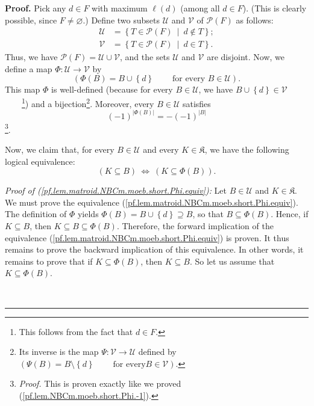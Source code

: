 \documentclass[numbers=enddot,12pt,final,onecolumn,notitlepage]{scrartcl}%
\theoremstyle{definition}
\newenvironment{proof}[1][Proof]{\noindent\textbf{#1.} }{\ \rule{0.5em}{0.5em}}
\begin{document}
\begin{proof}
Pick any $d\in F$ with maximum $\ell\left(  d\right)  $ (among all $d\in F$).
(This is clearly possible, since $F\neq\varnothing$.) Define two subsets
$\mathcal{U}$ and $\mathcal{V}$ of $\mathcal{P}\left(  F\right)  $ as follows:%
\begin{align*}
\mathcal{U}  &  =\left\{  T\in\mathcal{P}\left(  F\right)  \ \mid\ d\notin
T\right\}  ;\\
\mathcal{V}  &  =\left\{  T\in\mathcal{P}\left(  F\right)  \ \mid\ d\in
T\right\}  .
\end{align*}
Thus, we have $\mathcal{P}\left(  F\right)  =\mathcal{U}\cup\mathcal{V}$, and
the sets $\mathcal{U}$ and $\mathcal{V}$ are disjoint. Now, we define a map
$\Phi:\mathcal{U}\rightarrow\mathcal{V}$ by%
\[
\left(  \Phi\left(  B\right)  =B\cup\left\{  d\right\}
\ \ \ \ \ \ \ \ \ \ \text{for every }B\in\mathcal{U}\right)  .
\]
This map $\Phi$ is well-defined (because for every $B\in\mathcal{U}$, we have
$B\cup\left\{  d\right\}  \in\mathcal{V}$\ \ \ \ \footnote{This follows from
the fact that $d\in F$.}) and a bijection\footnote{Its inverse is the map
$\Psi:\mathcal{V}\rightarrow\mathcal{U}$ defined by $\left(  \Psi\left(
B\right)  =B\setminus\left\{  d\right\}  \ \ \ \ \ \ \ \ \ \ \text{for every
}B\in\mathcal{V}\right)  $.}. Moreover, every $B\in\mathcal{U}$ satisfies%
\begin{equation}
\left(  -1\right)  ^{\left\vert \Phi\left(  B\right)  \right\vert }=-\left(
-1\right)  ^{\left\vert B\right\vert }
\label{pf.lem.matroid.NBCm.moeb.short.Phi.-1}%
\end{equation}
\footnote{\textit{Proof.} This is proven exactly like we proved
(\ref{pf.lem.NBCm.moeb.short.Phi.-1}).}.

Now, we claim that, for every $B\in\mathcal{U}$ and every $K\in\mathfrak{K}$,
we have the following logical equivalence:%
\begin{equation}
\left(  K\subseteq B\right)  \ \Longleftrightarrow\ \left(  K\subseteq
\Phi\left(  B\right)  \right)  .
\label{pf.lem.matroid.NBCm.moeb.short.Phi.equiv}%
\end{equation}


\textit{Proof of (\ref{pf.lem.matroid.NBCm.moeb.short.Phi.equiv}):} Let
$B\in\mathcal{U}$ and $K\in\mathfrak{K}$. We must prove the equivalence
(\ref{pf.lem.matroid.NBCm.moeb.short.Phi.equiv}). The definition of $\Phi$
yields $\Phi\left(  B\right)  =B\cup\left\{  d\right\}  \supseteq B$, so that
$B\subseteq\Phi\left(  B\right)  $. Hence, if $K\subseteq B$, then $K\subseteq
B\subseteq\Phi\left(  B\right)  $. Therefore, the forward implication of the
equivalence (\ref{pf.lem.matroid.NBCm.moeb.short.Phi.equiv}) is proven. It
thus remains to prove the backward implication of this equivalence. In other
words, it remains to prove that if $K\subseteq\Phi\left(  B\right)  $, then
$K\subseteq B$. So let us assume that $K\subseteq\Phi\left(  B\right)  $.


\end{proof}
\end{document}
